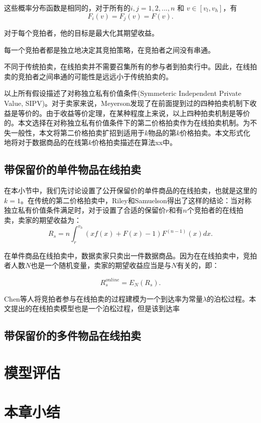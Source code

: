 \begin{assmp}[估价分布函数的对称性]
\label{conj:symmetric distribution function}
这些概率分布函数是相同的，对于所有的$i,j=1,2,...,n$ 和 $v\in[v_l,v_h]$，有
	\begin{equation}
	F_i(v)=F_j(v)=F(v).
	\end{equation}
 
\end{assmp}

\begin{assmp}[竞拍者风险中立]
\label{conj:risk nuetral}
对于每个竞拍者，他的目标是最大化其期望收益。
 
\end{assmp}

\begin{assmp}[无串通性]
\label{conj:no collusion}
每一个竞拍者都是独立地决定其竞拍策略，在竞拍者之间没有串通。
\end{assmp}

不同于传统拍卖，在线拍卖并不需要召集所有的参与者到拍卖行中。因此，在线拍卖的竞拍者之间串通的可能性是远远小于传统拍卖的。

以上所有假设描述了对称独立私有价值条件(Symmeteric Independent Private Value, SIPV)。对于卖家来说，Meyerson\cite{Myerson1981Optimal}发现了在前面提到过的四种拍卖机制下收益是等价的。由于收益等价定理，在某种程度上来说，以上四种拍卖机制是等价的。本文选择在对称独立私有价值条件下的第二价格拍卖作为在线拍卖机制。为不失一般性，本文将第二价格拍卖扩招到适用于$k$物品的第$k$价格拍卖。本文形式化地将对于数据商品的在线第$k$价格拍卖描述在算法xx中。



\subsection{带保留价的单件物品在线拍卖}

在本小节中，我们先讨论设置了公开保留价的单件商品的在线拍卖，也就是这里的$k=1$。在传统的第二价格拍卖中，Riley和Samuelson\cite{Riley1981Optimal}得出了这样的结论：当对称独立私有价值条件满足时，对于设置了合适的保留价$r$和有$n$个竞拍者的在线拍卖，卖家的期望收益为：
\begin{equation}
\label{eq:basic expected revenue}
R_s=n\int_{r}^{v_h}(xf(x)+F(x)-1)F^{(n-1)}(x)dx.
\end{equation}

在单件商品在线拍卖中，数据卖家只卖出一件数据商品。因为在在线拍卖中，竞拍者人数$N$也是一个随机变量，卖家的期望收益应当是与$N$有关的，即：

\begin{equation}
\label{eq:basic online expected revenue}
R_s^{online}=E_N(R_s).
\end{equation}

Chen等人\cite{Chen2007Optimal}将竞拍者参与在线拍卖的过程建模为一个到达率为常量$\lambda$的泊松过程。本文提出的在线拍卖模型也是一个泊松过程，但是该到达率



\subsection{带保留价的多件物品在线拍卖}

\section{模型评估}

\section{本章小结}